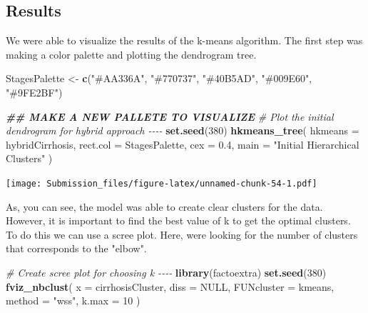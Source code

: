 \documentclass[
]{article}
\newenvironment{Shaded}{\begin{snugshade}}{\end{snugshade}}
\newcommand{\AttributeTok}[1]{\textcolor[rgb]{0.13,0.29,0.53}{#1}}
\newcommand{\CommentTok}[1]{\textcolor[rgb]{0.56,0.35,0.01}{\textit{#1}}}
\newcommand{\ConstantTok}[1]{\textcolor[rgb]{0.56,0.35,0.01}{#1}}
\newcommand{\DecValTok}[1]{\textcolor[rgb]{0.00,0.00,0.81}{#1}}
\newcommand{\DocumentationTok}[1]{\textcolor[rgb]{0.56,0.35,0.01}{\textbf{\textit{#1}}}}
\newcommand{\FloatTok}[1]{\textcolor[rgb]{0.00,0.00,0.81}{#1}}
\newcommand{\FunctionTok}[1]{\textcolor[rgb]{0.13,0.29,0.53}{\textbf{#1}}}
\newcommand{\NormalTok}[1]{#1}
\newcommand{\OtherTok}[1]{\textcolor[rgb]{0.56,0.35,0.01}{#1}}
\newcommand{\StringTok}[1]{\textcolor[rgb]{0.31,0.60,0.02}{#1}}
\begin{document}
\hypertarget{results-1}{%
\subsection{Results}\label{results-1}}

We were able to visualize the results of the k-means algorithm. The
first step was making a color palette and plotting the dendrogram tree.

\begin{Shaded}
\begin{Highlighting}[]
\NormalTok{StagesPalette }\OtherTok{\textless{}{-}} \FunctionTok{c}\NormalTok{(}\StringTok{"\#AA336A"}\NormalTok{, }\StringTok{"\#770737"}\NormalTok{, }\StringTok{"\#40B5AD"}\NormalTok{, }\StringTok{"\#009E60"}\NormalTok{, }\StringTok{"\#9FE2BF"}\NormalTok{)}
\end{Highlighting}
\end{Shaded}

\begin{Shaded}
\begin{Highlighting}[]
\DocumentationTok{\#\# MAKE A NEW PALLETE TO VISUALIZE}
\CommentTok{\# Plot the initial dendrogram for hybrid approach {-}{-}{-}{-}}
\FunctionTok{set.seed}\NormalTok{(}\DecValTok{380}\NormalTok{)}
\FunctionTok{hkmeans\_tree}\NormalTok{(}
  \AttributeTok{hkmeans =}\NormalTok{ hybridCirrhosis,}
  \AttributeTok{rect.col =}\NormalTok{ StagesPalette,}
  \AttributeTok{cex =} \FloatTok{0.4}\NormalTok{,}
  \AttributeTok{main =} \StringTok{"Initial Hierarchical Clusters"}
\NormalTok{)}
\end{Highlighting}
\end{Shaded}

\texttt{[image: Submission\_files/figure-latex/unnamed-chunk-54-1.pdf]}

As, you can see, the model was able to create clear clusters for the
data. However, it is important to find the best value of k to get the
optimal clusters. To do this we can use a scree plot. Here,
we\textquotesingle re looking for the number of clusters that
corresponds to the "elbow".

\begin{Shaded}
\begin{Highlighting}[]
\CommentTok{\# Create scree plot for choosing k {-}{-}{-}{-}}
\FunctionTok{library}\NormalTok{(factoextra)}
\FunctionTok{set.seed}\NormalTok{(}\DecValTok{380}\NormalTok{)}
\FunctionTok{fviz\_nbclust}\NormalTok{(}
  \AttributeTok{x =}\NormalTok{ cirrhosisCluster,}
  \AttributeTok{diss =} \ConstantTok{NULL}\NormalTok{,}
  \AttributeTok{FUNcluster =}\NormalTok{ kmeans,}
  \AttributeTok{method =} \StringTok{"wss"}\NormalTok{,}
  \AttributeTok{k.max =} \DecValTok{10}
\NormalTok{)}
\end{Highlighting}
\end{Shaded}
\end{document}
